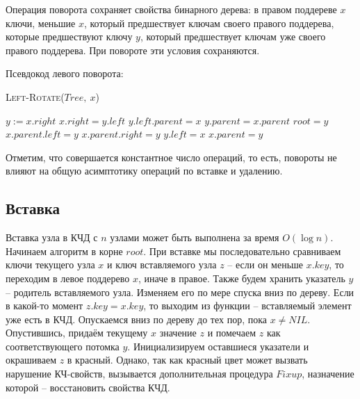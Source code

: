 \documentclass[a4paper,12pt]{article}
\newcommand{\algname}[1]{\textsc{#1}}
\begin{document}
Операция поворота сохраняет свойства бинарного дерева: в правом поддереве $x$ ключи, меньшие $x$, который предшествует ключам своего правого поддерева, которые предшествуют ключу $y$, который предшествует ключам уже своего правого поддерева. При повороте эти условия сохраняются. 

Псевдокод левого поворота:

\begin{algorithm}
  	\caption{\algname{Left-Rotate}($Tree,\ x$)}
	\begin{algorithmic}
	    \State $y := x.right$
	    \State $x.right = y.left$ 
	    \State 
	        \State $y.left.parent = x$
	   \EndIf
	   \State $y.parent = x.parent$
	        \State $root = y$
	        \State $x.parent.left = y$
	   \Else
	        \State $x.parent.right = y$
	   \EndIf
	   \State $y.left = x$
	   \State $x.parent = y$
	\end{algorithmic}
\end{algorithm}

Отметим, что совершается константное число операций, то есть, повороты не влияют на общую асимптотику операций по вставке и удалению.

\subsection{Вставка}

Вставка узла в КЧД с $n$ узлами может быть выполнена за время $O(\log n)$. Начинаем алгоритм в корне $root$. При вставке мы последовательно сравниваем ключи текущего узла $x$ и ключ вставляемого узла $z$ -- если он меньше $x.key$, то переходим в левое поддерево $x$, иначе в правое. Также будем хранить указатель $y$ -- родитель вставляемого узла. Изменяем его по мере спуска вниз по дереву. Если в какой-то момент $z.key = x.key$, то выходим из функции -- вставляемый элемент уже есть в КЧД. Опускаемся вниз по дереву до тех пор, пока $x\neq NIL$. Опустившись, придаём текущему $x$ значение $z$ и помечаем $z$ как соответствующего потомка $y$. Инициализируем оставшиеся указатели и окрашиваем $z$ в красный. Однако, так как красный цвет может вызвать нарушение КЧ-свойств, вызывается дополнительная процедура $Fixup$, назначение которой -- восстановить свойства КЧД.
\end{document}
